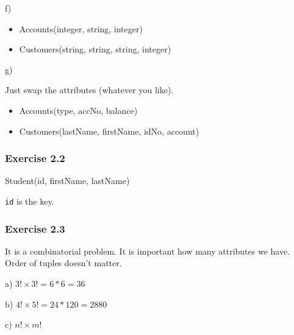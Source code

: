 \documentclass[../../main.tex]{subfiles}
\begin{document}
f)

\begin{itemize}
  \item Accounts(integer, string, integer)
  \item Customers(string, string, string, integer)
\end{itemize}

g)

Just swap the attributes (whatever you like).

\begin{itemize}
  \item Accounts(type, accNo, balance)
  \item Customers(lastName, firstName, idNo, account)
\end{itemize}

\subsubsection*{Exercise 2.2}

Student(id, firstName, lastName)

\verb|id| is the key.

\subsubsection*{Exercise 2.3}

It is a combinatorial problem. It is important how many
attributes we have. Order of tuples doesn't matter.

a) $3! \times 3! = 6 * 6 = 36$

b) $4! \times 5! = 24 * 120 = 2880$

c) $n! \times m!$
\end{document}
